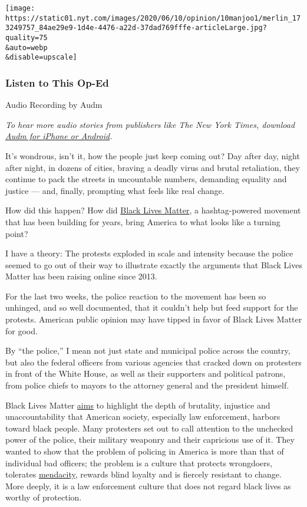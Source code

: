 \texttt{[image: https://static01.nyt.com/images/2020/06/10/opinion/10manjoo1/merlin\_173249757\_84ae29e9-1d4e-4476-a22d-37dad769fffe-articleLarge.jpg?quality=75\\\&auto=webp\\\&disable=upscale]}

\hypertarget{listen-to-this-op-ed}{%
\subsubsection{Listen to This Op-Ed}\label{listen-to-this-op-ed}}

Audio Recording by Audm

\emph{To hear more audio stories from publishers like The New York
Times, download}
\href{https://www.audm.com/?utm_source=nytopinion\&utm_medium=embed\&utm_campaign=black_lives_winning}{\emph{Audm
for iPhone or Android}}\emph{.}

It's wondrous, isn't it, how the people just keep coming out? Day after
day, night after night, in dozens of cities, braving a deadly virus and
brutal retaliation, they continue to pack the streets in uncountable
numbers, demanding equality and justice --- and, finally, prompting what
feels like real change.

How did this happen? How did
\href{https://www.nytimes.com/interactive/2020/06/10/upshot/black-lives-matter-attitudes.html}{Black
Lives Matter}, a hashtag-powered movement that has been building for
years, bring America to what looks like a turning point?

I have a theory: The protests exploded in scale and intensity because
the police seemed to go out of their way to illustrate exactly the
arguments that Black Lives Matter has been raising online since 2013.

For the last two weeks, the police reaction to the movement has been so
unhinged, and so well documented, that it couldn't help but feed support
for the protests. American public opinion may have tipped in favor of
Black Lives Matter for good.

By ``the police,'' I mean not just state and municipal police across the
country, but also the federal officers from various agencies that
cracked down on protesters in front of the White House, as well as their
supporters and political patrons, from police chiefs to mayors to the
attorney general and the president himself.

Black Lives Matter \href{https://blacklivesmatter.com/about/}{aims} to
highlight the depth of brutality, injustice and unaccountability that
American society, especially law enforcement, harbors toward black
people. Many protesters set out to call attention to the unchecked power
of the police, their military weaponry and their capricious use of it.
They wanted to show that the problem of policing in America is more than
that of individual bad officers; the problem is a culture that protects
wrongdoers, tolerates
\href{https://apnews.com/a172fb01bdb74b4159b39da390d9e79e}{mendacity},
rewards blind loyalty and is fiercely resistant to change. More deeply,
it is a law enforcement culture that does not regard black lives as
worthy of protection.

